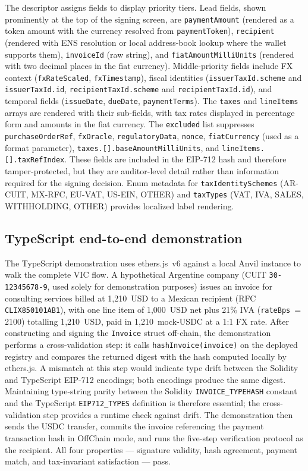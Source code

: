 \documentclass[11pt,a4paper]{article}
\begin{document}
The descriptor assigns fields to display priority tiers. Lead fields, shown prominently at the top of the signing screen, are \texttt{paymentAmount} (rendered as a token amount with the currency resolved from \texttt{paymentToken}), \texttt{recipient} (rendered with ENS resolution or local address-book lookup where the wallet supports them), \texttt{invoiceId} (raw string), and \texttt{fiatAmountMilliUnits} (rendered with two decimal places in the fiat currency). Middle-priority fields include FX context (\texttt{fxRateScaled}, \texttt{fxTimestamp}), fiscal identities (\texttt{issuerTaxId.scheme} and \texttt{issuerTaxId.id}, \texttt{recipientTaxId.scheme} and \texttt{recipientTaxId.id}), and temporal fields (\texttt{issueDate}, \texttt{dueDate}, \texttt{paymentTerms}). The \texttt{taxes} and \texttt{lineItems} arrays are rendered with their sub-fields, with tax rates displayed in percentage form and amounts in the fiat currency. The \texttt{excluded} list suppresses \texttt{purchaseOrderRef}, \texttt{fxOracle}, \texttt{regulatoryData}, \texttt{nonce}, \texttt{fiatCurrency} (used as a format parameter), \texttt{taxes.[].baseAmountMilliUnits}, and \texttt{lineItems.[].taxRefIndex}. These fields are included in the EIP-712 hash and therefore tamper-protected, but they are auditor-level detail rather than information required for the signing decision. Enum metadata for \texttt{taxIdentitySchemes} (AR-CUIT, MX-RFC, EU-VAT, US-EIN, OTHER) and \texttt{taxTypes} (VAT, IVA, SALES, WITHHOLDING, OTHER) provides localized label rendering.

\subsection{TypeScript end-to-end demonstration}

The TypeScript demonstration uses ethers.js~v6 against a local Anvil instance to walk the complete VIC flow. A hypothetical Argentine company (CUIT \texttt{30-12345678-9}, used solely for demonstration purposes) issues an invoice for consulting services billed at 1{,}210~USD to a Mexican recipient (RFC \texttt{CLIX850101AB1}), with one line item of 1{,}000~USD net plus 21\% IVA (\texttt{rateBps}~= 2100) totalling 1{,}210~USD, paid in 1{,}210~mock-USDC at a 1:1 FX rate. After constructing and signing the \texttt{Invoice} struct off-chain, the demonstration performs a cross-validation step: it calls \texttt{hashInvoice(invoice)} on the deployed registry and compares the returned digest with the hash computed locally by ethers.js. A mismatch at this step would indicate type drift between the Solidity and TypeScript EIP-712 encodings; both encodings produce the same digest. Maintaining type-string parity between the Solidity \texttt{INVOICE\_TYPEHASH} constant and the TypeScript \texttt{EIP712\_TYPES} definition is therefore essential; the cross-validation step provides a runtime check against drift. The demonstration then sends the USDC transfer, commits the invoice referencing the payment transaction hash in OffChain mode, and runs the five-step verification protocol as the recipient. All four properties --- signature validity, hash agreement, payment match, and tax-invariant satisfaction --- pass.
\end{document}
